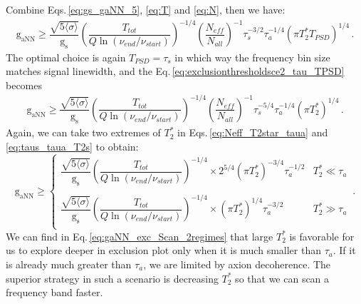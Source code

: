 Combine Eqs.\,\eqref{eq:gs_gaNN_5}, \eqref{eq:T} and \eqref{eq:N}, then we have:
\begin{align}
    \mathrm{g_{aNN}} \geqslant \dfrac{\sqrt{5 \langle\sigma\rangle}}{\mathrm{g_{s}}} 
    \left(\dfrac{T_{tot}}{Q \ln{ \left(\nu_{end}/\nu_{start} \right) } }\right)^{-1/4}      
    \left(\dfrac{N_{eff}}{N_{all}}\right)^{-1} \tau_s^{-3/2}  \tau_a^{-1/4} (\pi T_2^* T_{PSD})^{1/4}
    \,. \label{eq:exclusionthresholdsce2_tau_TPSD} 
\end{align}
The optimal choice is again $T_{PSD} = \tau_s$ in which way the frequency bin size matches signal linewidth, and the Eq.\,\eqref{eq:exclusionthresholdsce2_tau_TPSD} becomes
\begin{align}
    \mathrm{g_{aNN}} \geqslant \dfrac{\sqrt{5 \langle\sigma\rangle}}{\mathrm{g_{s}}} 
    \left(\dfrac{T_{tot}}{Q \ln{ \left(\nu_{end}/\nu_{start} \right) } }\right)^{-1/4} 
    \left(\dfrac{N_{eff}}{N_{all}}\right)^{-1} \tau_s^{-5/4} \tau_a^{-1/4} (\pi T_2^*)^{1/4}
    \,. \label{eq:exclusionthresholdsce2_tau} 
\end{align}
Again, we can take two extremes of $T_2^*$ in Eqs.\,\eqref{eq:Neff_T2star_taua} and \eqref{eq:taus_taua_T2s} to obtain:
\begin{equation}
    \mathrm{g_{aNN}} \geqslant \left\{
    \begin{array}{cl}
    \dfrac{\sqrt{5 \langle\sigma\rangle}}{\mathrm{g_{s}}} 
    \left(\dfrac{T_{tot}}{Q \ln{ \left(\nu_{end}/\nu_{start} \right) } }\right)^{-1/4}   
     \times 2^{5/4} (\pi T_2^*)^{-3/4} \tau_a^{-1/2} 
    &  T_2^* \ll \tau_a\\
     & \\
    \dfrac{\sqrt{5 \langle\sigma\rangle}}{\mathrm{g_{s}}} 
    \left(\dfrac{T_{tot}}{Q \ln{ \left(\nu_{end}/\nu_{start} \right) } }\right)^{-1/4}    
     \times (\pi T_2^*)^{1/4} \tau_a^{-3/2}
    &  T_2^*  \gg \tau_a\\
    \end{array} \right.
    \,.\label{eq:gaNN_exc_Scan_2regimes}
\end{equation}
We can find in Eq.\,\eqref{eq:gaNN_exc_Scan_2regimes} that large $T_2^*$ is favorable for us to explore deeper in exclusion plot only when it is much smaller than $\tau_a$. If it is already much greater than $\tau_a$, we are limited by axion decoherence. The superior strategy in such a scenario is decreasing $T_2^*$ so that we can scan a frequency band faster. 




